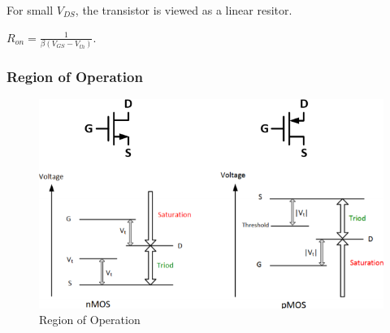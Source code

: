 For small $V_{DS}$, the transistor is viewed as a linear resitor. 

$R_{on} = \frac{1}{\beta (V_{GS} - V_{th})}$.

\subsubsection{Region of Operation}

\begin{figure}[h]
    \centering
    \includegraphics[scale=1]{images/MOS_relative_voltage.png}
    \caption{Region of Operation}
\end{figure}